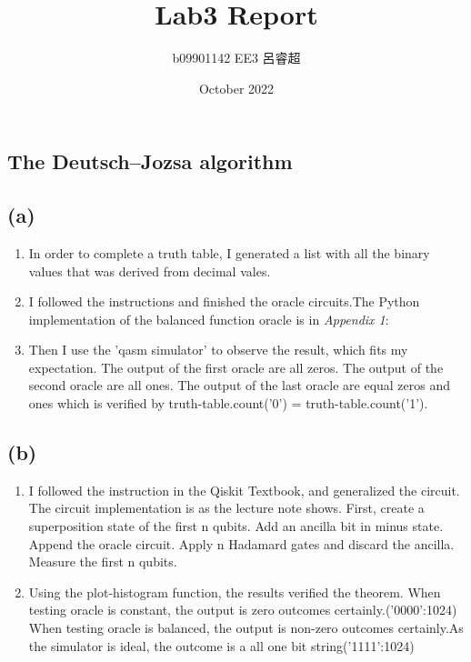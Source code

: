 \documentclass{article}
\title{Lab3 Report}
\author{b09901142 EE3 呂睿超}
\date{October 2022}
\begin{document}
\begin{CJK*}{UTF8}{bsmi}
\maketitle

\section{The Deutsch–Jozsa algorithm}
\subsection{(a)}
\begin{enumerate}
\item In order to complete a truth table, I generated a list with all the binary values that was derived from decimal vales.
\item I followed the instructions and finished the oracle circuits.The Python implementation of the balanced function oracle is in \emph {Appendix 1}:

\item Then I use the 'qasm simulator' to observe the result, which fits my expectation.
The output of the first oracle are all zeros. The output of the second oracle are all ones.
The output of the last oracle are equal zeros and ones which is verified by truth-table.count('0') = truth-table.count('1').

\end{enumerate}
\subsection{(b)} 
\begin{enumerate}
\item I followed the instruction in the Qiskit Textbook, and generalized the circuit. The circuit implementation is as the lecture note shows. First, create a superposition state of the first n qubits. Add an ancilla bit in minus state. Append the oracle circuit. Apply n Hadamard gates and discard the ancilla. Measure the first n qubits.

\item Using the plot-histogram function, the results verified the theorem. When testing oracle is constant, the output is zero outcomes certainly.({'0000':1024})
When testing oracle is balanced, the output is non-zero outcomes certainly.As the simulator is ideal, the outcome is a all one bit string({'1111':1024})
\end{enumerate}



\end{CJK*}
\end{document}
